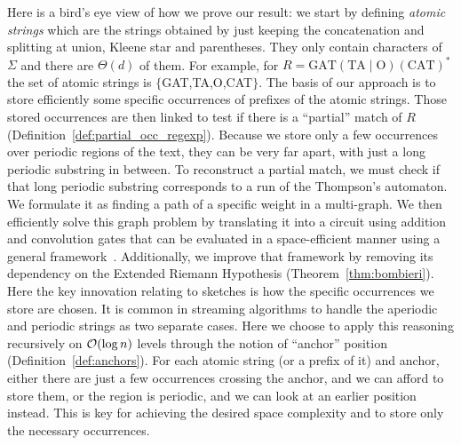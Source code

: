 Here is a bird's eye view of how we prove our result: we start by defining \emph{atomic strings} which are the strings obtained by just keeping the concatenation and splitting at union, Kleene star and parentheses. They only contain characters of $\Sigma$ and there are $\Theta(d)$ of them. For example, for $R= \mathrm{GAT}(\mathrm{TA}\mid \mathrm{O})(\mathrm{CAT})^*$  the set of atomic strings is $\{$GAT,TA,O,CAT$\}$.
%
The basis of our approach is to store efficiently some specific occurrences of prefixes of the atomic strings. Those stored occurrences are then linked to test if there is a “partial” match of $R$ (Definition~\ref*{def:partial_occ_regexp}). Because we store only a few occurrences over periodic regions of the text, they can be very far apart, with just a long periodic substring in between. To reconstruct a partial match, we must check if that long periodic substring corresponds to a run of the Thompson's automaton. We formulate it as finding a path of a specific weight in a multi-graph. We then efficiently solve this graph problem by translating it into a circuit using addition and convolution gates that can be evaluated in a space-efficient manner using a general framework~\cite{LokshtanovN10,Bringmann17}. Additionally, we improve that framework by removing its dependency on the Extended Riemann Hypothesis (Theorem~\ref{thm:bombieri}). 
Here the key innovation relating to sketches is how the specific occurrences we store are chosen. It is common in streaming algorithms to handle the aperiodic and periodic strings as two separate cases.
Here we choose to apply this reasoning recursively on $\mathcal{O}(\log n)$ levels through the notion of ``anchor'' position (Definition~\ref{def:anchors}). For each atomic string (or a prefix of it) and anchor, either there are just a few occurrences crossing the anchor, and we can afford to store them, or the region is periodic, and we can look at an earlier position instead. This is key for achieving the desired space complexity and to store only the necessary occurrences.


